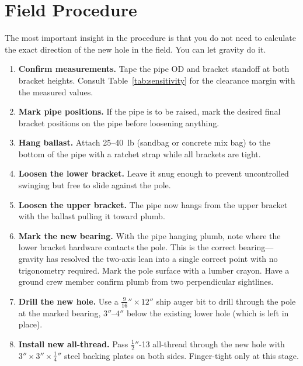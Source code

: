 \documentclass[11pt,twocolumn]{article}
\begin{document}
\section{Field Procedure}

The most important insight in the procedure is that you do not need to
calculate the exact direction of the new hole in the field. You can let
gravity do it.

\begin{enumerate}[leftmargin=*, itemsep=4pt, label=\arabic{*}.]
\item \textbf{Confirm measurements.} Tape the pipe OD and bracket standoff at
  both bracket heights. Consult Table~\ref{tab:sensitivity} for the clearance
  margin with the measured values.

\item \textbf{Mark pipe positions.} If the pipe is to be raised, mark the
  desired final bracket positions on the pipe before loosening anything.

\item \textbf{Hang ballast.} Attach 25--40~lb (sandbag or concrete mix bag)
  to the bottom of the pipe with a ratchet strap while all brackets are tight.

\item \textbf{Loosen the lower bracket.} Leave it snug enough to prevent
  uncontrolled swinging but free to slide against the pole.

\item \textbf{Loosen the upper bracket.} The pipe now hangs from the upper
  bracket with the ballast pulling it toward plumb.

\item \textbf{Mark the new bearing.} With the pipe hanging plumb, note where
  the lower bracket hardware contacts the pole. This is the correct bearing---
  gravity has resolved the two-axis lean into a single correct point with no
  trigonometry required. Mark the pole surface with a lumber crayon.
  Have a ground crew member confirm plumb from two perpendicular sightlines.

\item \textbf{Drill the new hole.} Use a $\tfrac{9}{16}'' \times 12''$ ship
  auger bit to drill through the pole at the marked bearing, $3''$--$4''$
  below the existing lower hole (which is left in place).

\item \textbf{Install new all-thread.} Pass $\tfrac{1}{2}''$-13 all-thread
  through the new hole with $3'' \times 3'' \times \tfrac{1}{4}''$ steel
  backing plates on both sides. Finger-tight only at this stage.


\end{enumerate}
\end{document}
